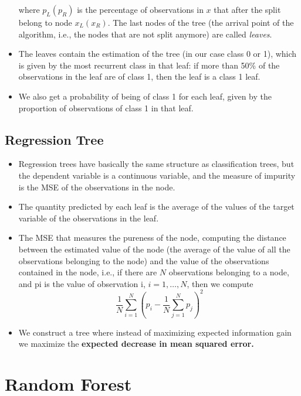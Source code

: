 \begin{itemize}
          where $p_{L}( p_{R})$ is the percentage of observations in $x$ that after the split belong to node $x_{L}( x_{R})$. The last nodes of the tree (the arrival point of the algorithm, i.e., the nodes that are not split anymore) are called \textit{leaves}. 
    \item The leaves contain the estimation of the tree (in our case class 0 or 1), which is given by the most recurrent class in that leaf: if more than 50\% of the observations in the leaf are of class 1, then the leaf is a class 1 leaf.
    \item We also get a probability of being of class 1 for each leaf, given by the proportion of observations of class 1 in that leaf.
\end{itemize}

\subsection{Regression Tree}

\begin{itemize}
    \item Regression trees have basically the same structure as classification trees, but the dependent variable is a continuous variable, and the measure of impurity is the MSE of the observations in the node. 
    \item The quantity predicted by each leaf is the average of the values of the target variable of the observations in the leaf.
    \item The MSE that measures the pureness of the node, computing the distance between the estimated value of the node (the average of the value of all the observations belonging to the node) and the value of the observations contained in the node, i.e., if there are $N$ observations belonging to a node, and pi is the value of observation i, $i=1,\dotsc ,N$, then we compute
          \begin{equation*}
              \frac{1}{N}\sum\limits _{i=1}^{N}\left( p_{i} -\frac{1}{N}\sum\limits _{j=1}^{N} p_{j}\right)^{2}
          \end{equation*}
    \item We construct a tree where instead of maximizing expected information gain we maximize the \textbf{expected decrease in mean squared error.}
\end{itemize}

\section{Random Forest}

